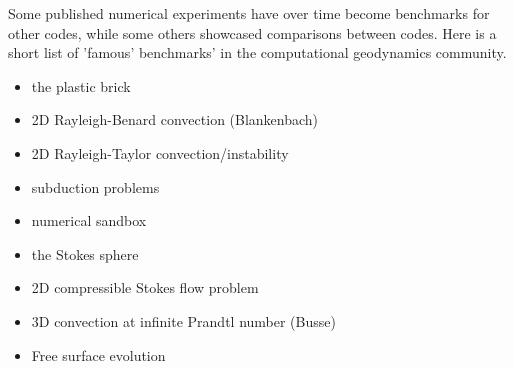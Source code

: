 Some published numerical experiments have over time become benchmarks for other codes, while some 
others showcased comparisons between codes. Here is a short list of 'famous' benchmarks' in the 
computational geodynamics community.

\begin{itemize}
\item the plastic brick \cite{lemm08,kaus10,qurj09}
\item 2D Rayleigh-Benard convection (Blankenbach)  \cite{blbc89,trha98,chhl08,king09,lezh11,vyrc13,trab90}
\item 2D Rayleigh-Taylor convection/instability \cite{pros81,trab90,soga01,taki03,bomh06, basd08,qurj09,saev10,lezh11,vyrc13,vkks97,} 
\item subduction problems \cite{scbe08,vkck08}
\item numerical sandbox \cite{bbeg06,busa16}
\item the Stokes sphere \cite{galemanual}
\item 2D compressible Stokes flow problem \cite{lezh08}
\item 3D convection at infinite Prandtl number (Busse) \cite{bucc93,trha98}
\item Free surface evolution \cite{crsg12}
\end{itemize}

